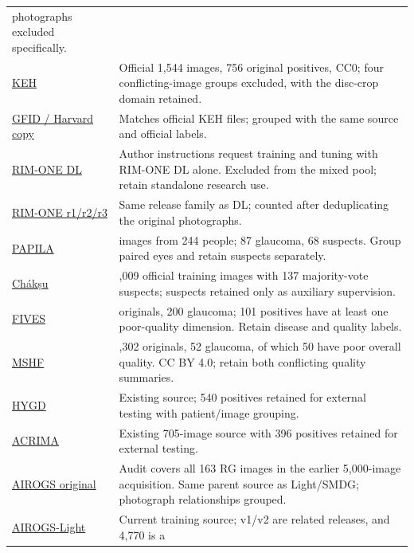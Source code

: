 \documentclass[
  10pt,
]{article}
\begin{document}
\begin{longtable}[]{@{}
  >{\raggedright\arraybackslash}p{}
  >{\raggedright\arraybackslash}p{}@{}}
photographs excluded specifically. \\
\href{https://doi.org/10.7910/DVN/1YRRAC}{KEH} & Official 1,544 images,
756 original positives, CC0; four conflicting-image groups excluded,
with the disc-crop domain retained. \\
\href{https://zenodo.org/records/12562673}{GFID / Harvard copy} &
Matches official KEH files; grouped with the same source and official
labels. \\
\href{https://github.com/miag-ull/rim-one-dl}{RIM-ONE DL} & Author
instructions request training and tuning with RIM-ONE DL alone. Excluded
from the mixed pool; retain standalone research use. \\
\href{https://github.com/miag-ull/rim-one-dl}{RIM-ONE r1/r2/r3} & Same
release family as DL; counted after deduplicating the original
photographs. \\
\href{https://doi.org/10.6084/m9.figshare.14798004.v2}{PAPILA} & 488
images from 244 people; 87 glaucoma, 68 suspects. Group paired eyes and
retain suspects separately. \\
\href{https://doi.org/10.6084/m9.figshare.20123135.v2}{Chákṣu} & 1,009
official training images with 137 majority-vote suspects; suspects
retained only as auxiliary supervision. \\
\href{https://doi.org/10.6084/m9.figshare.19688169.v1}{FIVES} & 800
originals, 200 glaucoma; 101 positives have at least one poor-quality
dimension. Retain disease and quality labels. \\
\href{https://doi.org/10.6084/m9.figshare.21507564.v1}{MSHF} & 1,302
originals, 52 glaucoma, of which 50 have poor overall quality. CC BY
4.0; retain both conflicting quality summaries. \\
\href{https://physionet.org/content/hillel-yaffe-glaucoma-dataset/1.1.0/}{HYGD}
& Existing source; 540 positives retained for external testing with
patient/image grouping. \\
\href{https://figshare.com/s/c2d31f850af14c5b5232}{ACRIMA} & Existing
705-image source with 396 positives retained for external testing. \\
\href{https://zenodo.org/records/5793241}{AIROGS original} & Audit
covers all 163 RG images in the earlier 5,000-image acquisition. Same
parent source as Light/SMDG; photograph relationships grouped. \\
\href{https://www.kaggle.com/datasets/deathtrooper/glaucoma-dataset-eyepacs-airogs-light-v2}{AIROGS-Light}
& Current training source; v1/v2 are related releases, and 4,770 is a

\end{longtable}
\end{document}
